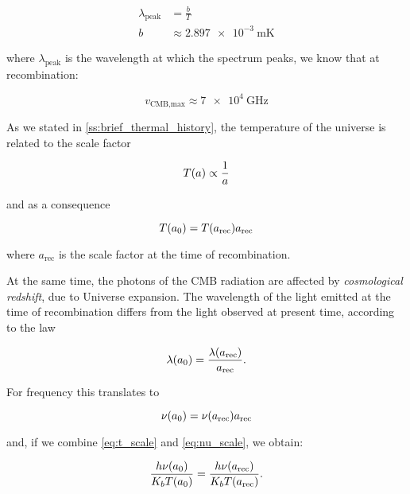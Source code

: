 \begin{align}
        \lambda_{\text{peak}} & = \frac{b}{T} \\
        b & \approx \SI{2.897e-3}{\meter\kelvin}
\end{align}

where $\lambda_{\text{peak}}$ is the wavelength at which the spectrum
peaks, we know that at recombination:

\begin{equation}
        v_{\text{CMB,max}} \approx \SI{7e4}{\giga\hertz}
\end{equation}

As we stated in \autoref{ss:brief_thermal_history}, the temperature of the
universe is related to the scale factor

\begin{equation}
        T\qty(a) \propto \frac{1}{a}
\end{equation}

and as a consequence

\begin{equation}
        T\qty(a_0) = T\qty(a_{\text{rec}}) a_{\text{rec}}
        \label{eq:t_scale}
\end{equation}

where $a_{\text{rec}}$ is the scale factor at the time of recombination.

At the same time, the photons of the CMB radiation are affected by \emph{cosmological
redshift}, due to Universe expansion. The wavelength of the light emitted
at the time of recombination differs from the light observed at present
time, according to the law

\begin{equation}
        \lambda\qty(a_0) = \frac{\lambda\qty(a_{\text{rec}})}{a_{\text{rec}}}.
\end{equation}

For frequency this translates to

\begin{equation}
        \nu\qty(a_0) = \nu\qty(a_{\text{rec}}) a_{\text{rec}}
        \label{eq:nu_scale}
\end{equation}

and, if we combine \autoref{eq:t_scale} and \autoref{eq:nu_scale}, we
obtain:

\begin{equation}
        \frac{h \nu\qty(a_0)}{K_b T\qty(a_0)} =
        \frac{h \nu\qty(a_{\text{rec}})}{K_b T\qty(a_{\text{rec}})}.
\end{equation}

